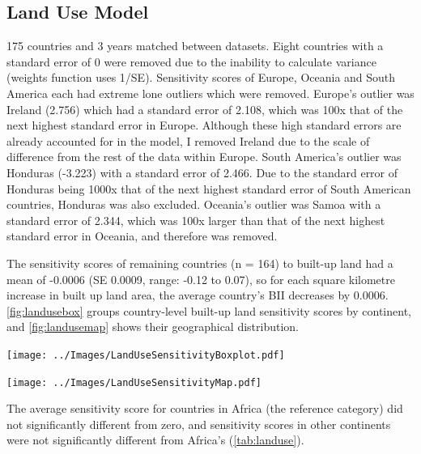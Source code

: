 \documentclass[11pt, a4paper, titlepage]{article}
\begin{document}
\newpage
	\subsection*{Land Use Model}
	
	175 countries and 3 years matched between datasets. Eight countries with a standard error of 0 were removed due to the inability to calculate variance (weights function uses 1/SE). Sensitivity scores of Europe, Oceania and South America each had extreme lone outliers which were removed. Europe's outlier was Ireland (2.756) which had a standard error of 2.108, which was 100x that of the next highest standard error in Europe. Although these high standard errors are already accounted for in the model, I removed Ireland due to the scale of difference from the rest of the data within Europe. South America's outlier was Honduras (-3.223) with a standard error of 2.466. Due to the standard error of Honduras being 1000x that of the next highest standard error of South American countries, Honduras was also excluded. Oceania's outlier was Samoa with a standard error of 2.344, which was 100x larger than that of the next highest standard error in Oceania, and therefore was removed.
	
	 The sensitivity scores of remaining countries (n = 164) to built-up land had a mean of -0.0006 (SE 0.0009, range: -0.12 to 0.07), so for each square kilometre increase in built up land area, the average country's BII decreases by 0.0006. \autoref{fig:landusebox} groups  country-level built-up land sensitivity scores by continent, and \autoref{fig:landusemap} shows their geographical distribution.
	
	\begin{center}
		
		\texttt{[image: ../Images/LandUseSensitivityBoxplot.pdf]}
		\label{fig:landusebox}
		
		\texttt{[image: ../Images/LandUseSensitivityMap.pdf]}
		\label{fig:landusemap}
		

    \end{center}

    The average sensitivity score for countries in Africa (the reference category) did not significantly different from zero, and sensitivity scores in other continents were not significantly different from Africa's (\autoref{tab:landuse}).
    
\end{document}
